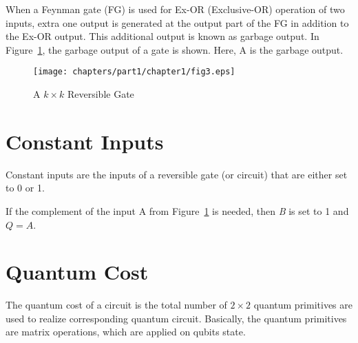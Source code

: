
\begin{example}\textnormal{
When a Feynman gate (FG) is used for Ex-OR (Exclusive-OR) operation of two inputs, extra one output is generated at the output part of the FG in addition to the Ex-OR output. This additional output is known as garbage output. In Figure~\ref{fig:p1_c1_fig3}, the garbage output of a gate is shown. Here, A is the garbage output.}
\end{example}

\begin{figure}[H]
\centering
\texttt{[image: chapters/part1/chapter1/fig3.eps]}
\caption{A $k \times k$ Reversible Gate}
\label{fig:p1_c1_fig3}
\end{figure}

\section{Constant Inputs}
Constant inputs are the inputs of a reversible gate (or circuit) that are either set to 0 or 1.

\begin{example}\textnormal{
If the complement of the input A from Figure~\ref{fig:p1_c1_fig3} is needed, then \textit{B} is set to 1 and $Q = A$.}
\end{example}

\section{Quantum Cost}

The quantum cost of a circuit is the total number of $2 \times 2$ quantum primitives are used to realize corresponding quantum circuit. Basically, the quantum primitives are matrix operations, which are applied on qubits state.%



